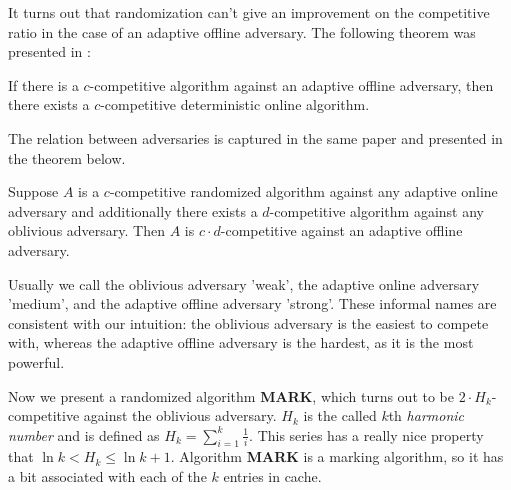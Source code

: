 It turns out that randomization can't give an improvement on the competitive 
ratio in the case of an adaptive offline adversary. The following theorem was 
presented in \cite{power}:
\begin{theorem}
If there is a $c$-competitive algorithm against an adaptive offline adversary, then 
there exists a $c$-competitive deterministic online algorithm. 
\end{theorem}
The relation between adversaries is captured in the same paper and presented in the 
theorem below.
\begin{theorem}
Suppose $A$ is a $c$-competitive randomized algorithm against any adaptive online 
adversary and additionally there exists a $d$-competitive algorithm against any 
oblivious adversary. Then $A$ is $c \cdot d$-competitive against an adaptive 
offline adversary.
\end{theorem}
Usually we call the oblivious adversary 'weak', the adaptive online adversary 'medium', and 
the adaptive offline adversary 'strong'. These informal names are consistent with our intuition: 
the oblivious adversary is the easiest to compete with, whereas the adaptive offline adversary is 
the hardest, as it is the most powerful.

Now we present a randomized algorithm \textbf{MARK}, which turns out to be 
$2 \cdot H_k$-competitive against the oblivious adversary. $H_k$ is the called $k$th 
\textit{harmonic number} and is defined as $H_k = \sum^k_{i=1} \frac{1}{i}$. 
This series has a really nice property that $\ln k < H_k \leq \ln k + 1$. 
Algorithm \textbf{MARK} is a marking algorithm, so it has a bit associated with 
each of the $k$ entries in cache.

